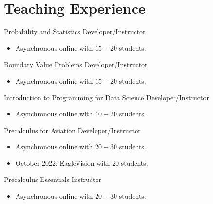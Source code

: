 \documentclass[10pt,a4paper,sans]{moderncv}
\begin{document}
	\section{Teaching Experience} 
	{Probability and Statistics}
	{Developer/Instructor}{}{}
	{\begin{itemize}
		\item Asynchronous online with $15-20$ students.
	\end{itemize} }
	
	{Boundary Value Problems}
	{Developer/Instructor}{}{}
	{\begin{itemize}
			\item Asynchronous online with $15-20$ students.
	\end{itemize} }
	{Introduction to Programming for Data Science}
	{Developer/Instructor}{}{}
	{\begin{itemize}
			\item Asynchronous online with $10-20$ students.
	\end{itemize} }
	{Precalculus for Aviation}
	{Developer/Instructor}{}{}
	{\begin{itemize}
			\item Asynchronous online with $20-30$ students.
			\item October 2022: EagleVision with 20 students.
	\end{itemize} }
	{Precalculus Essentials}
	{Instructor}{}{}
	{\begin{itemize}
			\item Asynchronous online with $20-30$ students.
	\end{itemize} }
\end{document}
